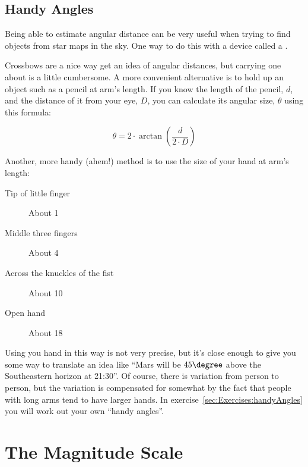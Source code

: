 \subsection{Handy Angles}
\label{sec:Concepts:Angles:HandyAngles}

Being able to estimate angular distance can be very useful when trying
to find objects from star maps in the sky. One way to do this with a
device called a .


Crossbows are a nice way get an idea of angular distances, but carrying
one about is a little cumbersome. A more convenient alternative is to
hold up an object such as a pencil at arm's length. If you know the
length of the pencil, $d$, and the distance of it from your eye, $D$, you
can calculate its angular size, $\theta$ using this formula:

\begin{equation}
\label{eq:handyAngle}
\theta=2 \cdot \arctan{\left(\frac{d}{2 \cdot D}\right) }
\end{equation}


\noindent Another, more handy (ahem!) method is to use the size of your hand at
arm's length:

\begin{description}
\item[Tip of little finger] About 1\degree 
\item[Middle three fingers] About 4\degree 
\item[Across the knuckles of the fist] About 10\degree 
\item[Open hand] About 18\degree
\end{description}

Using you hand in this way is not very precise, but it's close enough
to give you some way to translate an idea like ``Mars will be
$45\degree$ above the Southeastern horizon at 21:30''. Of course,
there is variation from person to person, but the variation is
compensated for somewhat by the fact that people with long arms tend
to have larger hands. In exercise~\ref{sec:Exercises:handyAngles} you
will work out your own ``handy angles''.



\section{The Magnitude Scale}
\label{sec:Concepts:Magnitudes}


